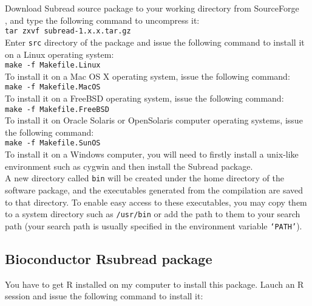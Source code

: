 \documentclass[12pt]{report}
\newcommand{\code}[1]{{\small\texttt{#1}}}
\newcommand{\Subread}{\textsf{Subread}}
\newcommand{\Rsubread}{\textsf{Rsubread}}
\newcommand{\R}{\textsf{R}}
\begin{document}
Download {\Subread} source package to your working directory from SourceForge \\
{}, and type the following command to uncompress it:\\

\code{tar zxvf subread-1.x.x.tar.gz}\\

Enter \code{src} directory of the package and issue the following command to install it on a Linux operating system: \\

\code{make -f Makefile.Linux}\\

To install it on a Mac OS X operating system, issue the following command:\\

\code{make -f Makefile.MacOS}\\

To install it on a FreeBSD operating system, issue the following command:\\

\code{make -f Makefile.FreeBSD}\\

To install it on Oracle Solaris or OpenSolaris computer operating systems, issue the following command:\\

\code{make -f Makefile.SunOS}\\

To install it on a Windows computer, you will need to firstly install a unix-like environment such as cygwin and then install the {\Subread} package.\\

A new directory called \code{bin} will be created under the home directory of the software package, and the executables generated from the compilation are saved to that directory.
To enable easy access to these executables, you may copy them to a system directory such as \code{/usr/bin} or add the path to them to your search path (your search path is usually specified in the environment variable \code{`PATH'}).


\subsection{Bioconductor {\Rsubread} package}

You have to get {\R} installed on my computer to install this package.
Lauch an {\R} session and issue the following command to install it:
\end{document}
